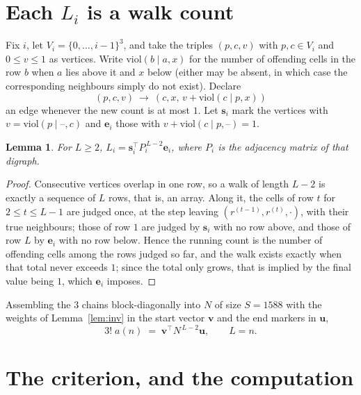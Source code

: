 \documentclass[11pt,a4paper]{article}
\theoremstyle{plain}
\newtheorem{lemma}[theorem]{Lemma}
\theoremstyle{definition}
\begin{document}
\section{Each $L_i$ is a walk count}

Fix $i$, let $V_i=\{0,\dots,i-1\}^{3}$, and take the triples $(p,c,v)$ with
$p,c\in V_i$ and $0\le v\le1$ as vertices. Write $\mathrm{viol}(b\mid a,x)$ for the number
of offending cells in the row $b$ when $a$ lies above it and $x$ below (either may be
absent, in which case the corresponding neighbours simply do not exist). Declare
\[
(p,c,v)\ \longrightarrow\ (c,x,\,v+\mathrm{viol}(c\mid p,x))
\]
an edge whenever the new count is at most $1$. Let $\mathbf{s}_i$ mark the vertices with
$v=\mathrm{viol}(p\mid\text{--},c)$ and $\mathbf{e}_i$ those with
$v+\mathrm{viol}(c\mid p,\text{--})=1$.

\begin{lemma}\label{lem:walk}
For $L\ge2$, $L_i=\mathbf{s}_i^{\!\top}P_i^{\,L-2}\mathbf{e}_i$, where $P_i$ is the
adjacency matrix of that digraph.
\end{lemma}

\begin{proof}
Consecutive vertices overlap in one row, so a walk of length $L-2$ is exactly a sequence
of $L$ rows, that is, an array. Along it, the cells of row $t$ for $2\le t\le L-1$ are
judged once, at the step leaving $(r^{(t-1)},r^{(t)},\cdot)$, with their true neighbours;
those of row $1$ are judged by $\mathbf{s}_i$ with no row above, and those of row
$L$ by $\mathbf{e}_i$ with no row below. Hence the running count is the number of
offending cells among the rows judged so far, and the walk exists exactly when that total
never exceeds $1$; since the total only grows, that is implied by the final value being
$1$, which $\mathbf{e}_i$ imposes.
\end{proof}

Assembling the $3$ chains block-diagonally into $N$ of size $S=1588$ with the weights of
Lemma~\ref{lem:inv} in the start vector $\mathbf{v}$ and the end markers in
$\mathbf{u}$,
\begin{equation}\label{eq:walk2}
3!\;a(n)\;=\;\mathbf{v}^{\!\top}N^{\,L-2}\mathbf{u},\qquad L=n .
\end{equation}

\section{The criterion, and the computation}
\end{document}
